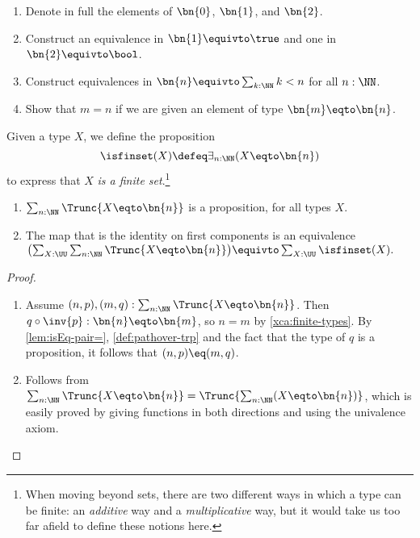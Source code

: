 \begin{xca}\label{xca:finite-types}
\hspace{1in}
  \begin{enumerate}
  \item Denote in full the elements of $\bn{0}$, $\bn{1} $, and $\bn{2}$.
  \item Construct an equivalence in $\bn{1} \equivto \true$
                         and one in $\bn{2} \equivto \bool$.
  \item Construct equivalences in  $\bn{n} \equivto \sum_{k:\NN} k<n$
        for all $n:\NN$.
  \item Show that $m=n$ if we are given an element of type
        $\bn{m} \eqto \bn{n}$.\qedhere
  \end{enumerate}
\end{xca}
\begin{definition}\label{def:is-finite}
  Given a type $X$, we define the proposition
  \[
    \textstyle
    \isfinset(X) \defeq \exists_{n:\NN}(X \eqto \bn{n})
  \]
  to express that $X$ \emph{is a finite set}.\footnote{%
    When moving beyond sets, there are two different ways
    in which a type can be finite: an \emph{additive}
    way and a \emph{multiplicative} way, but
    it would take us too far afield to define these notions
    here.} %
\end{definition}
\begin{lemma}\label{lem:maxonefinitetype}
\leavevmode
\begin{enumerate}
  \item $\sum_{n:\NN} \Trunc{X\eqto\bn{n}}$ is a proposition, for all types $X$.
  \item The map that is the identity on first components is an equivalence
    $\bigl(\sum_{X:\UU}\sum_{n:\NN} \Trunc{X\eqto\bn{n}}\bigr)
    \equivto \sum_{X:\UU}\isfinset(X).$
  \end{enumerate}
\end{lemma}
\begin{proof}
\begin{enumerate}
\item Assume $(n,p),(m,q): \sum_{n:\NN}\Trunc{X\eqto\bn{n}}$.
Then $q\circ\inv{p}: {\bn{n}\eqto\bn{m}}$, so ${n=m}$
by \cref{xca:finite-types}. By \cref{lem:isEq-pair=},
\cref{def:pathover-trp} and the fact that the type of $q$
is a proposition, it follows that $(n,p) \eq (m,q)$.
\item Follows from $\sum_{n:\NN}\Trunc{X\eqto\bn{n}} =
\Trunc{\sum_{n:\NN}(X \eqto \bn{n})}$,
which is easily proved by giving functions in both directions
and using the univalence axiom.\qedhere
\end{enumerate}
\end{proof}

